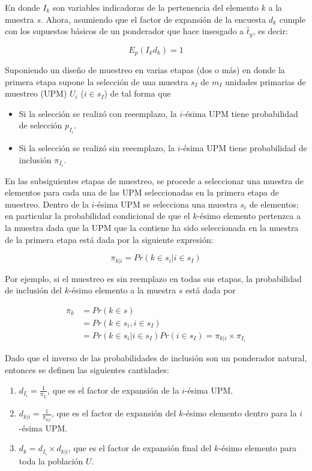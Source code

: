 \documentclass[
  12pt,
  spanish,
]{book}
\providecommand{\tightlist}{%
  \setlength{\itemsep}{0pt}\setlength{\parskip}{0pt}}
\begin{document}
En donde \(I_k\) son variables indicadoras de la pertenencia del elemento \(k\) a la muestra \(s\). Ahora, asumiendo que el factor de expansión de la encuesta \(d_k\) cumple con los supuestos básicos de un ponderador que hace insesgado a \(\hat{t}_{y}\), es decir:

\[
E_p(I_k d_k) = 1
\]

Suponiendo un diseño de muestreo en varias etapas (dos o más) en donde la primera etapa supone la selección de una muestra \(s_I\) de \(m_I\) unidades primarias de muestreo (UPM) \(U_i\) (\(i\in s_I\)) de tal forma que

\begin{itemize}
\tightlist
\item
  Si la selección se realizó con reeemplazo, la \(i\)-ésima UPM tiene probabilidad de selección \(p_{I_i}\).
\item
  Si la selección se realizó sin reeemplazo, la \(i\)-ésima UPM tiene probabilidad de inclusión \(\pi_{I_i}\).
\end{itemize}

En las subsiguientes etapas de muestreo, se procede a seleccionar una muestra de elementos para cada una de las UPM seleccionadas en la primera etapa de muestreo. Dentro de la \(i\)-ésima UPM se selecciona una muestra \(s_i\) de elementos; en particular la probabilidad condicional de que el \(k\)-ésimo elemento pertenzca a la muestra dada que la UPM que la contiene ha sido seleccionada en la muestra de la primera etapa está dada por la siguiente expresión:

\[
\pi_{k|i} = Pr(k \in s_i | i \in s_I)
\]

Por ejemplo, si el muestreo es sin reemplazo en todas sus etapas, la probabilidad de inclusión del \(k\)-ésimo elemento a la muestra \(s\) está dada por

\begin{align*}
\pi_k & = Pr(k \in s)\\ 
& = Pr(k \in s_i, i \in s_I) \\
& = Pr(k \in s_i | i \in s_I) Pr(i \in s_I) = \pi_{k|i} \times \pi_{I_i}
\end{align*}

Dado que el inverso de las probabilidades de inclusión son un ponderador natural, entonces se definen las siguientes cantidades:

\begin{enumerate}
\def\labelenumi{\arabic{enumi}.}
\tightlist
\item
  \(d_{I_i} = \frac{1}{\pi_{I_i}}\), que es el factor de expansión de la \(i\)-ésima UPM.
\item
  \(d_{k|i} = \frac{1}{\pi_{k|i}}\), que es el factor de expansión del \(k\)-ésimo elemento dentro para la \(i\)-ésima UPM.
\item
  \(d_k = d_{I_i} \times d_{k|i}\), que es el factor de expansión final del \(k\)-ésimo elemento para toda la población \(U\).
\end{enumerate}
\end{document}
